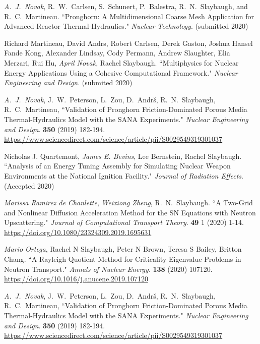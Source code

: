\begin{bibsection}
\item \textit{A.\ J.\ Novak}, R.\ W.\ Carlsen, S.\ Schunert, P.\ Balestra, R.\
N.\ Slaybaugh, and R.\ C.\ Martineau. ``Pronghorn: A Multidimensional Coarse
Mesh Application for Advanced Reactor Thermal-Hydraulics." \textit{Nuclear
Technology}. (submitted 2020)

\item Richard Martineau, David Andrs, Robert Carlsen, Derek Gaston, Joshua
Hansel Fande Kong, Alexander Lindsay, Cody Permann, Andrew Slaughter, Elia
Merzari, Rui Hu, \textit{April Novak}, Rachel Slaybaugh. ``Multiphysics for
Nuclear Energy Applications Using a Cohesive Computational Framework."
\textit{Nuclear Engineering and Design}. (submited 2020)

\item \textit{A.\ J.\ Novak}, J.\ W.\ Peterson, L.\ Zou, D.\ Andr\v{s}, R.\ N.\ Slaybaugh, R.\ C.\ Martineau, ``Validation of Pronghorn Friction-Dominated Porous Media Thermal-Hydraulics Model with the SANA Experiments." \textit{Nuclear Engineering and Design}. \textbf{350} (2019) 182-194.\\
\url{https://www.sciencedirect.com/science/article/pii/S0029549319301037}

\item Nicholas J. Quartemont, \textit{James E. Bevins}, Lee Bernstein, Rachel
Slaybaugh. ``Analysis of an Energy Tuning Assembly for Simulating Nuclear Weapon
Environments at the National Ignition Facility." \textit{Journal of Radiation
Effects}. (Accepted 2020)

\item \textit{Marissa Ramirez de Chanlette}, \textit{Weixiong Zheng}, R.\ N.\
Slaybaugh. ``A Two-Grid and Nonlinear Diffusion Acceleration Method for the SN
Equations with Neutron Upscattering." \textit{Journal of Computational Transport
Theory}. \textbf{49} 1 (2020) 1-14. \\
\url{https://doi.org/10.1080/23324309.2019.1695631}

\item \textit{Mario Ortega}, Rachel N Slaybaugh, Peter N Brown, Teresa S Bailey,
Britton Chang. ``A Rayleigh Quotient Method for Criticality Eigenvalue Problems
in Neutron Transport." \textit{Annals of Nuclear Energy}. \textbf{138} (2020)
107120.\\
\url{https://doi.org/10.1016/j.anucene.2019.107120}

\item \textit{A.\ J.\ Novak}, J.\ W.\ Peterson, L.\ Zou, D.\ Andr\v{s}, R.\ N.\ Slaybaugh, R.\ C.\ Martineau, ``Validation of Pronghorn Friction-Dominated Porous Media Thermal-Hydraulics Model with the SANA Experiments." \textit{Nuclear Engineering and Design}. \textbf{350} (2019) 182-194.\\
\url{https://www.sciencedirect.com/science/article/pii/S0029549319301037}


\end{bibsection}
